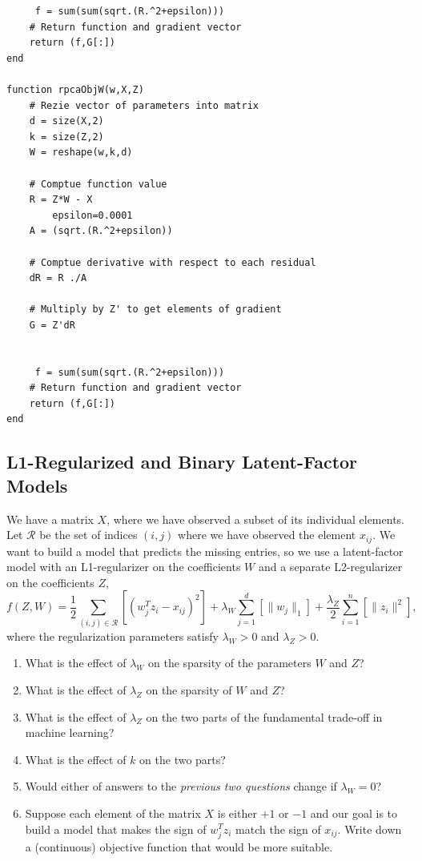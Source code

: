 \documentclass{article}
\def\blu#1{{\color{blu}#1}}
\def\norm#1{\|#1\|}
\def\enum#1{\begin{enumerate}#1\end{enumerate}}
\begin{document}
\begin{verbatim}
     f = sum(sum(sqrt.(R.^2+epsilon)))
    # Return function and gradient vector
    return (f,G[:])
end

function rpcaObjW(w,X,Z)
    # Rezie vector of parameters into matrix
    d = size(X,2)
    k = size(Z,2)
    W = reshape(w,k,d)

    # Comptue function value
    R = Z*W - X
        epsilon=0.0001
    A = (sqrt.(R.^2+epsilon))

    # Comptue derivative with respect to each residual
    dR = R ./A

    # Multiply by Z' to get elements of gradient
    G = Z'dR


     f = sum(sum(sqrt.(R.^2+epsilon)))
    # Return function and gradient vector
    return (f,G[:])
end

\end{verbatim}

\subsection{L1-Regularized and Binary Latent-Factor Models}

We have a matrix $X$, where we have observed a subset of its individual elements. Let $\mathcal{R}$ be the set of indices $(i,j)$ where we have observed the element $x_{ij}$. We want to build a model that predicts the missing entries, so we use a latent-factor model with an L1-regularizer on the coefficients $W$ and a separate L2-regularizer on the coefficients $Z$,
\[
f(Z,W) = \frac{1}{2}\sum_{(i,j) \in \mathcal{R}}\left[(w_j^Tz_i - x_{ij})^2 \right] + \lambda_W \sum_{j=1}^d \left[\norm{w_j}_1\right] + \frac{\lambda_Z}{2} \sum_{i=1}^n \left[\norm{z_i}^2\right],
\]
where the regularization parameters satisfy $\lambda_W > 0$ and $\lambda_Z > 0$.

\blu{
\enum{
\item What is the effect of $\lambda_W$ on the sparsity of the parameters $W$ and $Z$? 
\item What is the effect of $\lambda_Z$ on the sparsity of $W$ and $Z$?
\item What is the effect of $\lambda_Z$ on the two parts of the fundamental trade-off in machine learning? 
\item What is the effect of $k$ on the two parts?
\item Would either of answers to the \emph{previous two questions} change if $\lambda_W = 0$?
\item Suppose each element of the matrix $X$ is either $+1$ or $-1$ and our goal is to build a model that makes the sign of $w_j^Tz_i$ match the sign of $x_{ij}$. Write down a (continuous) objective function that would be more suitable.
}}
\end{document}
